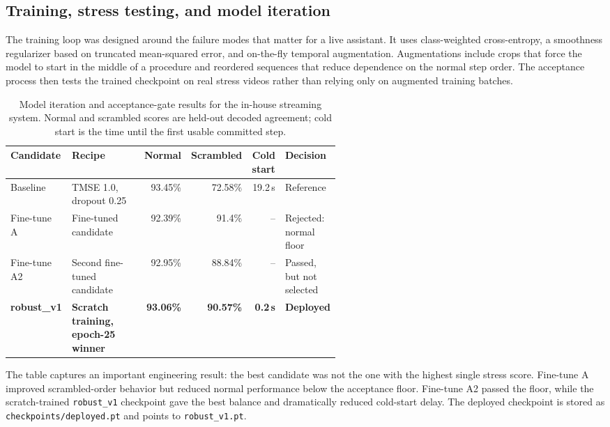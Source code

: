 \documentclass[11pt]{article}
\begin{document}
\subsection{Training, stress testing, and model iteration}
\label{sec:model_iteration}

The training loop was designed around the failure modes that matter for a live assistant. It uses class-weighted
cross-entropy, a smoothness regularizer based on truncated mean-squared error, and on-the-fly temporal
augmentation. Augmentations include crops that force the model to start in the middle of a procedure and
reordered sequences that reduce dependence on the normal step order. The acceptance process then tests the trained
checkpoint on real stress videos rather than relying only on augmented training batches.

\begin{table}[H]
\centering
\caption{Model iteration and acceptance-gate results for the in-house streaming system. Normal and scrambled
scores are held-out decoded agreement; cold start is the time until the first usable committed step.}
\label{tab:iteration}
\small
\begin{tabular}{@{}p{0.18\linewidth}p{0.22\linewidth}rrrp{0.15\linewidth}@{}}
\toprule
\textbf{Candidate} & \textbf{Recipe} & \textbf{Normal} & \textbf{Scrambled} & \textbf{Cold start} & \textbf{Decision} \\
\midrule
Baseline & TMSE 1.0, dropout 0.25 & 93.45\% & 72.58\% & 19.2\,s & Reference \\
Fine-tune A & Fine-tuned candidate & 92.39\% & 91.4\% & -- & Rejected: normal floor \\
Fine-tune A2 & Second fine-tuned candidate & 92.95\% & 88.84\% & -- & Passed, but not selected \\
\textbf{robust\_v1} & \textbf{Scratch training, epoch-25 winner} & \textbf{93.06\%} & \textbf{90.57\%} & \textbf{0.2\,s} & \textbf{Deployed} \\
\bottomrule
\end{tabular}
\end{table}

The table captures an important engineering result: the best candidate was not the one with the highest
single stress score. Fine-tune A improved scrambled-order behavior but reduced normal performance below the
acceptance floor. Fine-tune A2 passed the floor, while the scratch-trained \texttt{robust\_v1} checkpoint gave the
best balance and dramatically reduced cold-start delay. The deployed checkpoint is stored as
\texttt{checkpoints/deployed.pt} and points to \texttt{robust\_v1.pt}.
\end{document}
